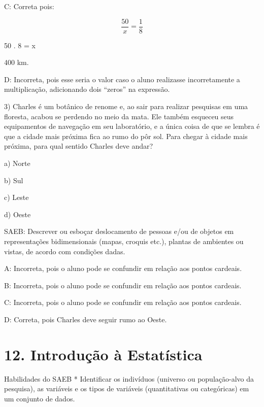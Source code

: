 C: Correta pois:

\[\frac {50}{x} = \frac {1}{8}\]

50 . 8 = x

400 km.

D: Incorreta, pois esse seria o valor caso o aluno realizasse
incorretamente a multiplicação, adicionando dois ``zeros'' na expressão.

3) Charles é um botânico de renome e, ao sair para realizar pesquisas em
uma floresta, acabou se perdendo no meio da mata. Ele também esqueceu
seus equipamentos de navegação em seu laboratório, e a única coisa de
que se lembra é que a cidade mais próxima fica ao rumo do pôr sol. Para
chegar à cidade mais próxima, para qual sentido Charles deve andar?

a) Norte

b) Sul

c) Leste

d) Oeste

SAEB: Descrever ou esboçar deslocamento de pessoas e/ou de objetos em
representações bidimensionais (mapas, croquis etc.), plantas de
ambientes ou vistas, de acordo com condições dadas.

A: Incorreta, pois o aluno pode se confundir em relação aos pontos
cardeais.

B: Incorreta, pois o aluno pode se confundir em relação aos pontos
cardeais.

C: Incorreta, pois o aluno pode se confundir em relação aos pontos
cardeais.

D: Correta, pois Charles deve seguir rumo ao Oeste.

\hypertarget{introduuxe7uxe3o-uxe0-estatuxedstica}{%
\section{12. Introdução à
Estatística}\label{introduuxe7uxe3o-uxe0-estatuxedstica}}

Habilidades do SAEB * Identificar os indivíduos (universo ou
população-alvo da pesquisa), as variáveis e os tipos de variáveis
(quantitativas ou categóricas) em um conjunto de dados.

